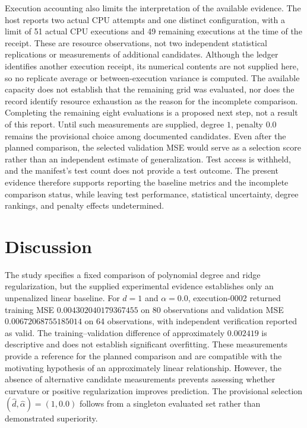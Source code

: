 \documentclass[11pt]{article}
\begin{document}
Execution accounting also limits the interpretation of the available evidence. The host reports two actual CPU attempts and one distinct configuration, with a limit of 51 actual CPU executions and 49 remaining executions at the time of the receipt. These are resource observations, not two independent statistical replications or measurements of additional candidates. Although the ledger identifies another execution receipt, its numerical contents are not supplied here, so no replicate average or between-execution variance is computed. The available capacity does not establish that the remaining grid was evaluated, nor does the record identify resource exhaustion as the reason for the incomplete comparison. Completing the remaining eight evaluations is a proposed next step, not a result of this report. Until such measurements are supplied, degree \(1\), penalty \(0.0\) remains the provisional choice among documented candidates. Even after the planned comparison, the selected validation MSE would serve as a selection score rather than an independent estimate of generalization. Test access is withheld, and the manifest's test count does not provide a test outcome. The present evidence therefore supports reporting the baseline metrics and the incomplete comparison status, while leaving test performance, statistical uncertainty, degree rankings, and penalty effects undetermined.

\section{Discussion}
The study specifies a fixed comparison of polynomial degree and ridge regularization, but the supplied experimental evidence establishes only an unpenalized linear baseline. For \(d=1\) and \(\alpha=0.0\), execution-0002 returned training MSE \(0.004302040179367455\) on 80 observations and validation MSE \(0.00672068755185014\) on 64 observations, with independent verification reported as valid. The training--validation difference of approximately \(0.002419\) is descriptive and does not establish significant overfitting. These measurements provide a reference for the planned comparison and are compatible with the motivating hypothesis of an approximately linear relationship. However, the absence of alternative candidate measurements prevents assessing whether curvature or positive regularization improves prediction. The provisional selection \((\widehat d,\widehat\alpha)=(1,0.0)\) follows from a singleton evaluated set rather than demonstrated superiority.
\end{document}
